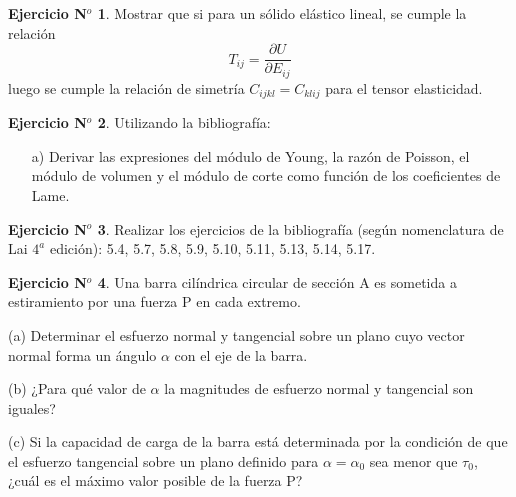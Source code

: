 \documentclass[12pt,a4paper]{article}
\theoremstyle{definition}
\newtheorem{theorem}{Ejercicio N$^o$}
\begin{document}
\bigskip


\begin{theorem}

Mostrar que si para un s\'olido el\'astico lineal, se cumple la relación 
\[
T_{ij}=\dfrac{\partial U}{\partial E_{ij}}
\]
\noindent luego se cumple la relaci\'on de simetr\'ia  $C_{ijkl}=C_{klij}$ para el tensor elasticidad.

\end{theorem}


\begin{theorem}

Utilizando la bibliografía:

\begin{itemize}

\item[a)] Derivar las expresiones del m\'odulo de Young, la raz\'on de Poisson, el módulo de volumen y el módulo de corte como funci\'on de los coeficientes de Lame.


\end{itemize}


\end{theorem}

\begin{theorem}

Realizar los ejercicios de la bibliografía (seg\'un nomenclatura de Lai $4^{a}$ edición): 5.4, 5.7, 5.8, 5.9, 5.10, 5.11, 5.13, 5.14, 5.17.

\end{theorem}


\pagebreak



\begin{theorem}

Una barra cilíndrica circular de sección A es sometida a estiramiento por una fuerza P en cada extremo.

(a) Determinar el esfuerzo normal y tangencial sobre un plano cuyo vector normal forma un ángulo $\alpha$ con el eje de la barra.

(b) ¿Para qué valor de $\alpha$ la magnitudes de esfuerzo normal y tangencial son iguales?

(c) Si la capacidad de carga de la barra está determinada por la condición de que el esfuerzo tangencial sobre un plano definido para $\alpha=\alpha_0$ sea menor que $\tau_0$, ¿cuál es el máximo valor posible de la fuerza P?


\end{theorem}
\end{document}
